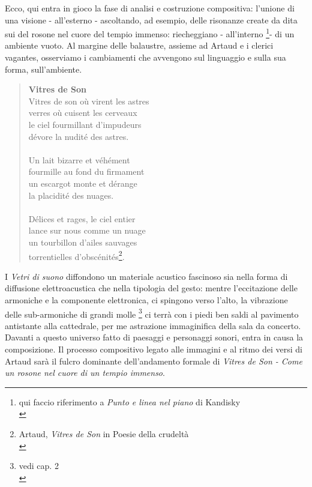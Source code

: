 Ecco, qui entra in gioco la fase di analisi e costruzione compositiva: l'unione di una visione - all'esterno - ascoltando, ad esempio, delle risonanze create da dita sui del rosone nel cuore del tempio immenso: riecheggiano - all'interno \footnote{qui faccio riferimento a \textit{Punto e linea nel piano} di Kandisky \\}- di un ambiente vuoto.
Al margine delle balaustre, assieme ad Artaud e i clerici vagantes, osserviamo i cambiamenti che avvengono sul linguaggio e sulla sua forma, sull'ambiente. \\
\begin{quotation}
\textbf{Vitres de Son} \\
Vitres de son où virent les astres \\
verres où cuisent les cerveaux \\
le ciel fourmillant d'impudeurs \\
dévore la nudité des astres. \\ \\ 
Un lait bizarre et véhément \\
fourmille au fond du firmament \\
un escargot monte et dérange \\
la placidité des nuages. \\ \\ 
Délices et rages, le ciel entier \\
lance sur nous comme un nuage \\
un tourbillon d'ailes sauvages \\
torrentielles d'obscénités\footnote{Artaud, \textit{Vitres de Son} in Poesie della crudeltà \\}. \\
\end{quotation}
I \textit{Vetri di suono} diffondono un materiale acustico fascinoso sia nella forma di diffusione elettroacustica che nella tipologia del gesto: mentre l'eccitazione delle armoniche e la componente elettronica, ci spingono verso l'alto, la vibrazione delle sub-armoniche di grandi molle \footnote{vedi cap. 2 \\} ci terrà con i piedi ben saldi al pavimento antistante alla cattedrale, per me astrazione immaginifica della sala da concerto. \\
Davanti a questo universo fatto di paesaggi e personaggi sonori, entra in causa la composizione. Il processo compositivo legato alle immagini e al ritmo dei versi di Artaud sarà il fulcro dominante dell'andamento formale di \textit{Vitres de Son - Come un rosone nel cuore di un tempio immenso}.